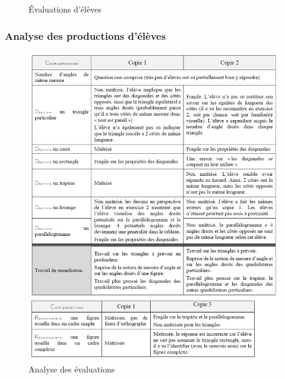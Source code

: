 \begin{figure}[!h]
	\qquad
	\caption{Évaluations d'élèves}
	\label{fig:Eval_diag_copies}
\end{figure}
\subsubsection*{Analyse des productions d'élèves}
\begin{figure}[!h]
	\centering
	\includegraphics[scale=0.75]{img/Analyse_eval_diag_ju.jpg}
	\caption{Analyse des évaluations}
\end{figure}
